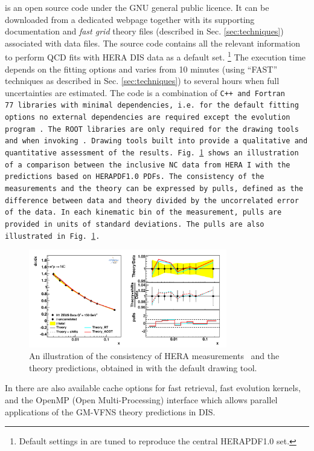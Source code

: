 
\fitter is an open source code under the GNU general public licence. It can be downloaded from a dedicated 
webpage \cite{herafitter:page}
together with its supporting documentation and 
\emph{fast grid} theory files (described in Sec. \ref{sec:techniques}) associated with data files.
The source code contains all the relevant information to perform QCD fits with HERA DIS data as a default 
set. \footnote{Default settings in \fitter are tuned to reproduce the central HERAPDF1.0 set.} 
The execution time depends on the fitting options and varies from 10 minutes 
(using ``FAST'' techniques as described in Sec. \ref{sec:techniques}) to several hours when 
full uncertainties are estimated. The \fitter code is a combination of \tt C++ \rm and \tt Fortran 77\rm \ libraries with minimal 
dependencies, i.e. for the default fitting options no external dependencies are required except the \qcdnum evolution program \cite{qcdnum}.
The \tt ROOT \rm  libraries are only required for the drawing tools and when invoking \applgrid.  
Drawing tools built into \fitter provide a qualitative and quantitative assessment of the results.
Fig.~\ref{fig:data} shows an illustration of a comparison between the inclusive NC data from HERA I
with the predictions based on HERAPDF1.0 PDFs.
The consistency of the measurements and the theory can be expressed by pulls, defined as the difference between data and theory divided by the uncorrelated error of the data. 
In each kinematic bin of the measurement, pulls are provided in units of standard deviations.  
The pulls are also illustrated in Fig.~\ref{fig:data}.
\begin{figure}[!ht]
   \centering
   \includegraphics[width=8.65cm]{datatheory.pdf}
   \caption{An illustration of the consistency of HERA measurements~\cite{h1zeus:2009wt} and the theory predictions, 
       obtained in \fitter with the default drawing tool.} 
 \label{fig:data}
\end{figure}


In \fitter there are also available cache options for fast retrieval, fast evolution kernels, and the OpenMP (Open Multi-Processing) 
interface which allows parallel applications of the GM-VFNS theory predictions in DIS. 


